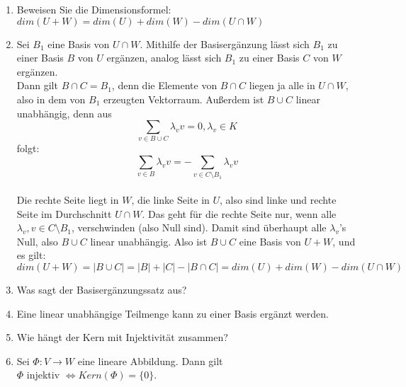 \documentclass[11pt,parskip=full]{scrartcl}
\newcommand{\answer}{\item[\textbf{Antwort}]}
\begin{document}
\begin{enumerate}[label=\textbf{\arabic*. Frage}]
		\item Beweisen Sie die Dimensionsformel: \(dim(U+W) = dim (U) + dim (W) - dim(U \cap W)\)
		\answer Sei $B_1$ eine Basis von $U \cap W$. Mithilfe der Basisergänzung lässt sich $B_1$ zu einer Basis $B$ von $U$ ergänzen, analog lässt sich $B_1$ zu einer Basis $C$ von $W$ ergänzen.\\
		Dann gilt \(B \cap C = B_1\), denn die Elemente von $B \cap C$ liegen ja alle in $U \cap W$, also in dem von $B_1$ erzeugten Vektorraum. Außerdem ist $B \cup C$ linear unabhängig, denn aus \[\sum_{v \in B \cup C} \lambda_v v = 0, \lambda_v \in K\] folgt: \\
		\[\sum_{v \in B} \lambda_v v = - \sum_{v \in C \setminus B_1} \lambda_v v\]\\
		Die rechte Seite liegt in $W$, die linke Seite in $U$, also sind linke und rechte Seite im Durchschnitt $U \cap W$. Das geht für die rechte Seite nur, wenn alle \(\lambda_v, v \in C \setminus B_1\), verschwinden (also Null sind). Damit sind überhaupt alle $\lambda_v$'s Null, also $B \cup C$ linear unabhängig. Also ist $B \cup C$ eine Basis von $U + W$, und es gilt: \\
		\(dim(U+W) = |B \cup C| = |B| + |C| - |B \cap C| = dim(U) + dim(W) - dim(U \cap W)\) 
		
		\item Was sagt der Basisergänzungssatz aus?
		\answer Eine linear unabhängige Teilmenge kann zu einer Basis ergänzt werden.
		
		\item Wie hängt der Kern mit Injektivität zusammen?
		\answer Sei \(\Phi : V \rightarrow W\) eine lineare Abbildung. Dann gilt\\
		$\Phi$ injektiv \(\iff Kern(\Phi) = \{0\}\).\\
%		
		

\end{enumerate}
\end{document}
